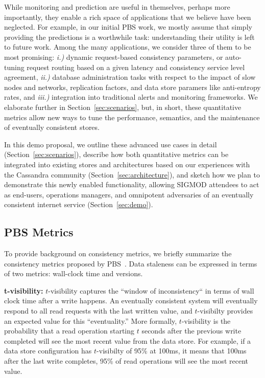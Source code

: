 While monitoring and prediction are useful in themselves, perhaps more
importantly, they enable a rich space of applications that we believe
have been neglected. For example, in our initial PBS work, we mostly
assume that simply providing the predictions is a worthwhile task:
understanding their utility is left to future work. Among the many 
applications, we consider three of them to be most promising: \textit{i.)} dynamic
request-based consistency parameters, or auto-tuning request routing
based on a given latency and consistency service level agreement,
\textit{ii.)} database administration tasks with respect to the impact
of slow nodes and networks, replication factors, and data store
paramers like anti-entropy rates, and \textit{iii.)} integration into
traditional alerts and monitoring frameworks. We elaborate further in
Section~\ref{sec:scenarios}, but, in short, these quantitative metrics
allow new ways to tune the performance, semantics, and the maintenance
of eventually consistent stores.

In this demo proposal, we outline these advanced use cases in detail
(Section~\ref{sec:scenarios}), describe how both quantitative metrics
can be integrated into existing stores and architectures based on our
experiences with the Cassandra community
(Section~\ref{sec:architecture}), and sketch how we plan to
demonstrate this newly enabled functionality, allowing SIGMOD
attendees to act as end-users, operations managers, and omnipotent
adversaries of an eventually consistent internet service
(Section~\ref{sec:demo}).

\subsection{PBS Metrics}
To provide background on consistency metrics, we briefly summarize the
consistency metrics proposed by PBS~\cite{pbs-vldb2012}. Data
staleness can be expressed in terms of two metrics: wall-clock time
and versions.

\textbf{t-visibility:} $t$-visibility captures the ``window of
inconsistency`` in terms of wall clock time after a write happens. An
eventually consistent system will eventually respond to all read
requests with the last written value, and $t$-visibilty provides an expected
value for this ``eventuality.''  More formally, $t$-visibility is the
probability that a read operation starting $t$ seconds after the
previous write completed will see the most recent value from the data
store. For example, if a data store configuration has $t$-visibilty of
95\% at 100ms, it means that 100ms after the last write completes,
95\% of read operations will see the most recent value.

